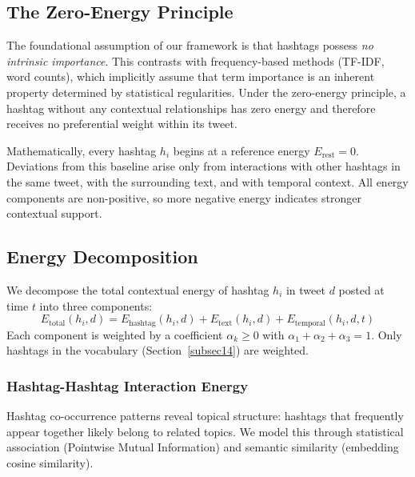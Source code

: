 \documentclass[pdflatex,sn-mathphys-num]{sn-jnl}%
\begin{document}
\subsection{The Zero-Energy Principle}\label{subsec8}

The foundational assumption of our framework is that hashtags possess \emph{no intrinsic importance}. This contrasts with frequency-based methods (TF-IDF, word counts), which implicitly assume that term importance is an inherent property determined by statistical regularities. Under the zero-energy principle, a hashtag without any contextual relationships has zero energy and therefore receives no preferential weight within its tweet.

Mathematically, every hashtag $h_i$ begins at a reference energy $E_{\text{rest}} = 0$. Deviations from this baseline arise only from interactions with other hashtags in the same tweet, with the surrounding text, and with temporal context. All energy components are non-positive, so more negative energy indicates stronger contextual support.

\subsection{Energy Decomposition}\label{subsec9}

We decompose the total contextual energy of hashtag $h_i$ in tweet $d$ posted at time $t$ into three components:
\begin{equation}
E_{\text{total}}(h_i, d) = E_{\text{hashtag}}(h_i, d) + E_{\text{text}}(h_i, d) + E_{\text{temporal}}(h_i, d, t)
\label{eq:total}
\end{equation}
Each component is weighted by a coefficient $\alpha_k \ge 0$ with $\alpha_1 + \alpha_2 + \alpha_3 = 1$. Only hashtags in the vocabulary (Section~\ref{subsec14}) are weighted.

\subsubsection{Hashtag-Hashtag Interaction Energy}\label{subsubsec1}

Hashtag co-occurrence patterns reveal topical structure: hashtags that frequently appear together likely belong to related topics. We model this through statistical association (Pointwise Mutual Information) and semantic similarity (embedding cosine similarity).
\end{document}
